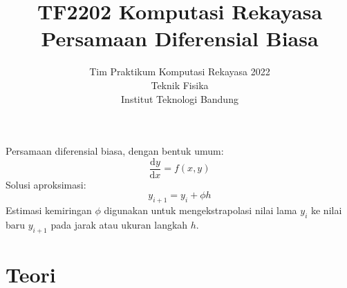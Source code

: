 



\title{%
{\small TF2202 Komputasi Rekayasa}\\
Persamaan Diferensial Biasa
}
\author{Tim Praktikum Komputasi Rekayasa 2022\\
Teknik Fisika\\
Institut Teknologi Bandung}
\date{}
\maketitle

Persamaan diferensial biasa, dengan bentuk umum:
\begin{equation*}
\frac{\mathrm{d}y}{\mathrm{d}x} = f(x,y)
\end{equation*}
Solusi aproksimasi:
\begin{equation*}
y_{i+1} = y_{i} + \phi h
\end{equation*}
Estimasi kemiringan $\phi$ digunakan untuk mengekstrapolasi nilai lama
$y_{i}$ ke nilai baru $y_{i+1}$ pada jarak atau ukuran langkah $h$.







\section*{Teori}




